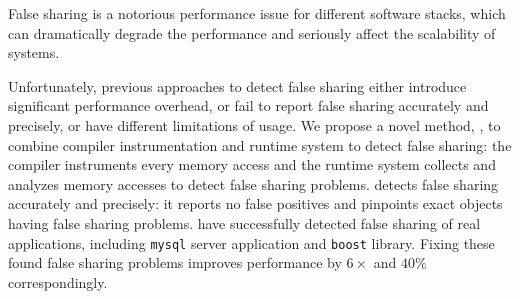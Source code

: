 
\begin{comment}
False sharing is notorious for performance degradation in multithreaded
programs. It apprears when two or more threads running on different cores periodically access 
different portions of data that can fit into one cache line. Since caching
system in a multicore processor needs to ensure a coherent view of memory
accross all cores, it has to grant an exclusive access
for each write operation by invidating duplicate copies in other cores. As a
result, frequent cache invalidation can seriously affect the scalability and
performance of multithreaded programs.
\end{comment} 

False sharing is a notorious performance issue for different software stacks, 
which can dramatically degrade the performance and seriously affect the scalability of 
systems.

Unfortunately, previous approaches to detect false sharing
either introduce significant performance overhead, or fail
to report false sharing accurately and precisely, or have different limitations of usage. 
We propose a novel method, \Predator{}, to combine compiler instrumentation
and runtime system to detect false sharing: 
the compiler instruments every memory access and 
the runtime system collects and analyzes memory accesses to detect false sharing problems.
\Predator{} detects false sharing accurately and precisely: it reports no 
false positives and pinpoints exact objects having false sharing problems.
\Predator{} have successfully detected false sharing of real applications,
including \texttt{mysql} server application and \texttt{boost} library. Fixing these found
false sharing problems improves performance by $6\times$ and $40\%$ correspondingly.

